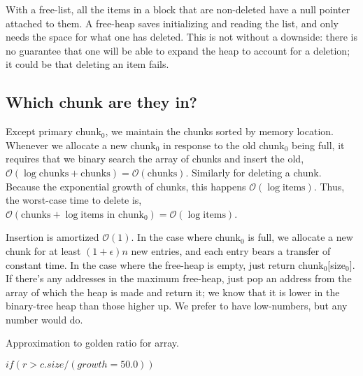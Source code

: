 \documentclass[12pt]{article}
\begin{document}
With a free-list, all the items in a block that are non-deleted have a null pointer attached to them. A free-heap saves initializing and reading the list, and only needs the space for what one has deleted. This is not without a downside: there is no guarantee that one will be able to expand the heap to account for a deletion; it could be that deleting an item fails.

\subsection{Which chunk are they in?}

Except primary chunk$_0$, we maintain the chunks sorted by memory location. Whenever we allocate a new chunk$_0$ in response to the old chunk$_0$ being full, it requires that we binary search the array of chunks and insert the old, $\mathcal{O}(\log \text{chunks} + \text{chunks}) = \mathcal{O}(\text{chunks})$. Similarly for deleting a chunk. Because the exponential growth of chunks, this happens $\mathcal{O}(\log \text{items})$. Thus, the worst-case time to delete is, $\mathcal{O}(\text{chunks} + \log \text{items in chunk$_0$}) = \mathcal{O}(\log \text{items})$.

Insertion is amortized $\mathcal{O}(1)$. In the case where chunk$_0$ is full, we allocate a new chunk for at least $(1+\epsilon)n$ new entries, and each entry bears a transfer of constant time. In the case where the free-heap is empty, just return chunk$_0[$size$_0]$. If there's any addresses in the maximum free-heap, just pop an address from the array of which the heap is made and return it; we know that it is lower in the binary-tree heap than those higher up. We prefer to have low-numbers, but any number would do.

Approximation to golden ratio for array.

$if(r > c.size / (growth=50.0))$
\end{document}
